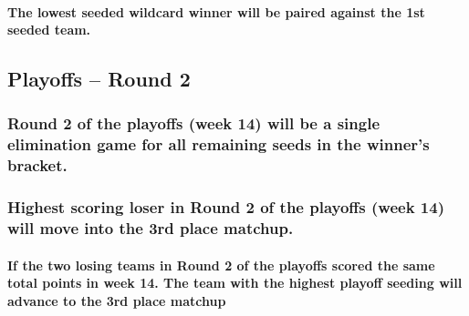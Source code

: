 \documentclass[
]{book}
\begin{document}
\hypertarget{the-lowest-seeded-wildcard-winner-will-be-paired-against-the-1st-seeded-team.}{%
\paragraph{The lowest seeded wildcard winner will be paired against the 1st seeded team.}\label{the-lowest-seeded-wildcard-winner-will-be-paired-against-the-1st-seeded-team.}}

\hypertarget{playoffs-round-2}{%
\subsection{Playoffs -- Round 2}\label{playoffs-round-2}}

\hypertarget{round-2-of-the-playoffs-week-14-will-be-a-single-elimination-game-for-all-remaining-seeds-in-the-winners-bracket.}{%
\subsubsection{Round 2 of the playoffs (week 14) will be a single elimination game for all remaining seeds in the winner's bracket.}\label{round-2-of-the-playoffs-week-14-will-be-a-single-elimination-game-for-all-remaining-seeds-in-the-winners-bracket.}}

\hypertarget{highest-scoring-loser-in-round-2-of-the-playoffs-week-14-will-move-into-the-3rd-place-matchup.}{%
\subsubsection{Highest scoring loser in Round 2 of the playoffs (week 14) will move into the 3rd place matchup.}\label{highest-scoring-loser-in-round-2-of-the-playoffs-week-14-will-move-into-the-3rd-place-matchup.}}

\hypertarget{if-the-two-losing-teams-in-round-2-of-the-playoffs-scored-the-same-total-points-in-week-14.-the-team-with-the-highest-playoff-seeding-will-advance-to-the-3rd-place-matchup}{%
\paragraph{If the two losing teams in Round 2 of the playoffs scored the same total points in week 14. The team with the highest playoff seeding will advance to the 3rd place matchup}\label{if-the-two-losing-teams-in-round-2-of-the-playoffs-scored-the-same-total-points-in-week-14.-the-team-with-the-highest-playoff-seeding-will-advance-to-the-3rd-place-matchup}}
\end{document}
